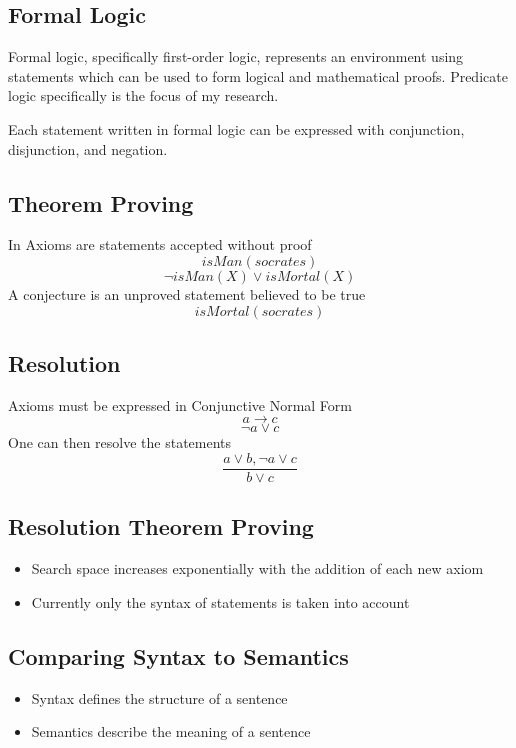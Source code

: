 \documentclass{article}
\begin{document}
\subsection{Formal Logic}
Formal logic, specifically first-order logic, represents an environment using statements which can be used to form logical and mathematical proofs. Predicate logic specifically is the focus of my research. 

Each statement written in formal logic can be expressed with conjunction, disjunction, and negation. 
	
\subsection{Theorem Proving}
In Axioms are statements accepted without proof
        \[isMan(socrates)\]
        \[\lnot isMan(X)\lor isMortal(X)\]
	    A conjecture is an unproved statement believed to be true 
	    \[isMortal(socrates)\]
	

	\subsection{Resolution}
		Axioms must be expressed in Conjunctive Normal Form
		\[a \rightarrow c\]
		\[\lnot a \lor c\]
		One can then resolve the statements
		\[\frac{a \lor b, \lnot a \lor c }{b \lor c}\]
	
	\subsection{Resolution Theorem Proving}
        \begin{itemize}
            \item Search space increases exponentially with the addition of each new axiom
            \item Currently only the syntax of statements is taken into account
        \end{itemize}
	
	\subsection{Comparing Syntax to Semantics}
		\begin{itemize}
		    \item Syntax defines the structure of a sentence
		    \item Semantics describe the meaning of a sentence
		\end{itemize}
	
\end{document}
